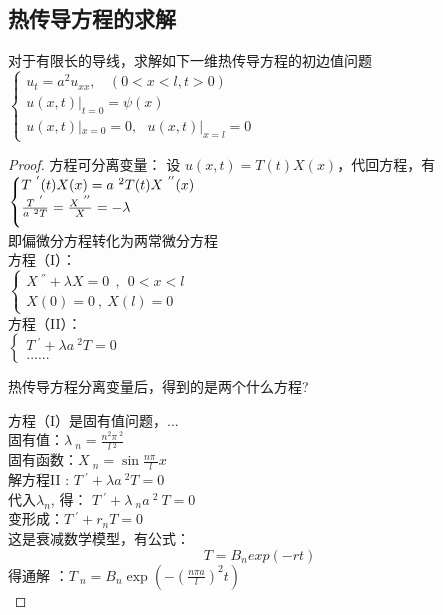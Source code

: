 \subsection{热传导方程的求解}
\begin{example} %
对于有限长的导线，求解如下一维热传导方程的初边值问题  \\
 $\displaystyle \begin{cases}
 u_{t}=a^2u_{xx} ,~~~~ (0<x<l, t>0)\\
u(x,t)|_{t=0}= \psi (x)  \\
u(x,t)|_{x=0}= 0, ~~~  u(x,t)|_{x=l}= 0 
\end{cases}$ \\
\begin{proof} 方程可分离变量：
设 $\displaystyle  u(x,t)=T(t)X(x) $，代回方程，有  \\
 $\displaystyle  \begin{cases}
  T~^{'}(t)X(x) =a~^2 T(t)X~^{''}(x) \\ \vspace{0.3cm}
 \frac{T~^{'}}{a~^2 T}=\frac{X~^{''} }{X} =-\lambda 
\end{cases}$ \\
即偏微分方程转化为两常微分方程 \\
方程（I）：\\
 $\displaystyle  \begin{cases}
	X~^{''} +\lambda X=0  ~~,~~ 0<x<l\\
   X(0)=0 ~,~X(l)=0
\end{cases}$ \\	
方程（II）：\\
 $\displaystyle  \begin{cases}
	T~^{'} +\lambda {a~^2 T}=0 \\
	......
\end{cases}$ \\	

\begin{remark}
	热传导方程分离变量后，得到的是两个什么方程?
\end{remark}

方程（I）是固有值问题，...\\
固有值：$\displaystyle  \lambda~_n=\frac{n^2\pi~^2}{l~^2}$ \\ 
固有函数：{\large $\displaystyle  X~_n= \sin \frac{n\pi~}{l} x$}\\

解方程II : 	$\displaystyle  T~^{'} +\lambda {a~^2 T}=0 $ \\ 
代入$\lambda_n$, 得：
$\displaystyle  T~^{'} +\lambda~_n a~^2 ~T=0 $ \\
变形成：$\displaystyle  T~^{'} + r_nT=0 $ \\ 
这是衰减数学模型，有公式：
\begin{equation*}
	T= B_n exp(-rt)
\end{equation*}
得通解 ：$\displaystyle T~_n=B_n  \exp(-(\frac{n\pi a}{l})^2 t)$ \\  \vspace{0.3cm}


\end{proof}
\end{example}
